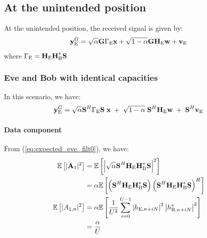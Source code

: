 


\subsection{At the unintended position}
At the unintended position, the received signal is given by:
\begin{equation}
    \textbf{y}_{\text{E}}^G = \sqrt{\alpha} \textbf{G}\Gamma_{\text{E}} \textbf{x} + \sqrt{1-\alpha} \textbf{G} \textbf{H}_{\text{E}} \textbf{w} + \textbf{v}_{\text{E}}
    \label{eq:appA_rx_eve}
\end{equation}
where $\Gamma_{\text{E}} = \textbf{H}_{\text{E}} \textbf{H}_{\text{B}}^*\textbf{S}$




\subsubsection{Eve and Bob with identical capacities}
In this scenario, we have:
\begin{equation}
    \textbf{y}_{\text{E}}^G = \sqrt{\alpha} \textbf{S}^H \Gamma_{\text{E}} \textbf{S}\; \textbf{x} \; +  \; \sqrt{1-\alpha} \; \textbf{S}^H \textbf{H}_{\text{E}} \textbf{w}  \; +  \; \textbf{S}^H  \textbf{v}_\text{E} 
    \label{eq:app:rx_eve_filt0}
\end{equation}


\paragraph*{Data component}
From (\ref{eq:expected_eve_filt0}), we have:
\begin{subequations}
    \begin{align}
        \mathbb{E} \left[|\textbf{A}_{1}|^2\right] &= \mathbb{E} \left[\left|\sqrt{\alpha}\textbf{S}^H \textbf{H}_{\text{E}}\textbf{H}_{\text{B}}^* \textbf{S}\right|^2\right] \\
        &= \alpha \mathbb{E} \left[\left( \textbf{S}^H \textbf{H}_{\text{E}}\textbf{H}_{\text{B}}^* \textbf{S} \right) \left( \textbf{S}^H \textbf{H}_{\text{E}}\textbf{H}_{\text{B}}^* \textbf{S}\right)^H\right] \\
        \mathbb{E} \left[|A_{1,n}|^2\right]&=\alpha \mathbb{E} \left[\frac{1}{U^2} \sum_{i=0}^{U-1} \left| h_{\text{E}, n + iN} \right|^2 \left| h^*_{\text{B}, n + iN}\right|^2 \right] \\
        &= \frac{\alpha}{U}
    \end{align}
    \label{eq:appA:data_eve_filt0}
\end{subequations}


